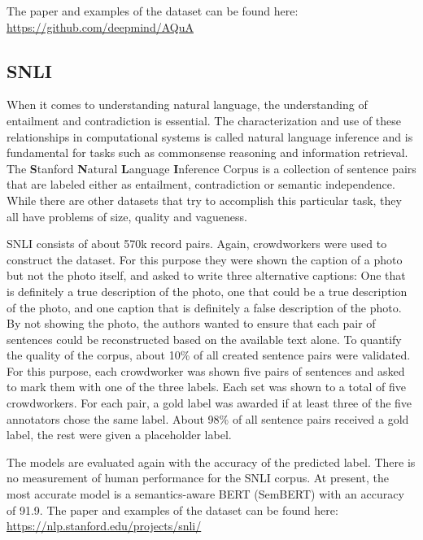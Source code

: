 \documentclass[]{krantz}
\begin{document}
The paper and examples of the dataset can be found here:
\center \url{https://github.com/deepmind/AQuA}

\flushleft

\hypertarget{snli}{%
\subsection{SNLI}\label{snli}}

When it comes to understanding natural language, the understanding of entailment and contradiction is essential. The characterization and use of these relationships in computational systems is called natural language inference and is fundamental for tasks such as commonsense reasoning and information retrieval. The \textbf{S}tanford \textbf{N}atural \textbf{L}anguage \textbf{I}nference Corpus is a collection of sentence pairs that are labeled either as entailment, contradiction or semantic independence.
While there are other datasets that try to accomplish this particular task, they all have problems of size, quality and vagueness.

SNLI consists of about 570k record pairs. Again, crowdworkers were used to construct the dataset. For this purpose they were shown the caption of a photo but not the photo itself, and asked to write three alternative captions: One that is definitely a true description of the photo, one that could be a true description of the photo, and one caption that is definitely a false description of the photo. By not showing the photo, the authors wanted to ensure that each pair of sentences could be reconstructed based on the available text alone.
To quantify the quality of the corpus, about 10\% of all created sentence pairs were validated. For this purpose, each crowdworker was shown five pairs of sentences and asked to mark them with one of the three labels. Each set was shown to a total of five crowdworkers. For each pair, a gold label was awarded if at least three of the five annotators chose the same label. About 98\% of all sentence pairs received a gold label, the rest were given a placeholder label. \citep{bowman2015large}

The models are evaluated again with the accuracy of the predicted label. There is no measurement of human performance for the SNLI corpus. At present, the most accurate model is a semantics-aware BERT (SemBERT) with an accuracy of 91.9.
The paper and examples of the dataset can be found here:
\center \url{https://nlp.stanford.edu/projects/snli/}

\flushleft
\end{document}
